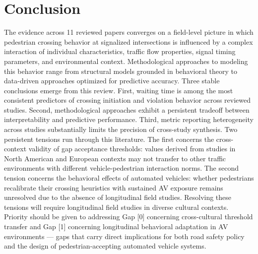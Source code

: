 \documentclass{article}
\begin{document}
\section{Conclusion}
The evidence across 11 reviewed papers converges on a field-level picture in which pedestrian crossing behavior at signalized intersections is influenced by a complex interaction of individual characteristics, traffic flow properties, signal timing parameters, and environmental context. Methodological approaches to modeling this behavior range from structural models grounded in behavioral theory to data-driven approaches optimized for predictive accuracy. Three stable conclusions emerge from this review. First, waiting time is among the most consistent predictors of crossing initiation and violation behavior across reviewed studies. Second, methodological approaches exhibit a persistent tradeoff between interpretability and predictive performance. Third, metric reporting heterogeneity across studies substantially limits the precision of cross-study synthesis. Two persistent tensions run through this literature. The first concerns the cross-context validity of gap acceptance thresholds: values derived from studies in North American and European contexts may not transfer to other traffic environments with different vehicle-pedestrian interaction norms. The second tension concerns the behavioral effects of automated vehicles: whether pedestrians recalibrate their crossing heuristics with sustained AV exposure remains unresolved due to the absence of longitudinal field studies. Resolving these tensions will require longitudinal field studies in diverse cultural contexts. Priority should be given to addressing Gap [0] concerning cross-cultural threshold transfer and Gap [1] concerning longitudinal behavioral adaptation in AV environments — gaps that carry direct implications for both road safety policy and the design of pedestrian-accepting automated vehicle systems.
\end{document}
